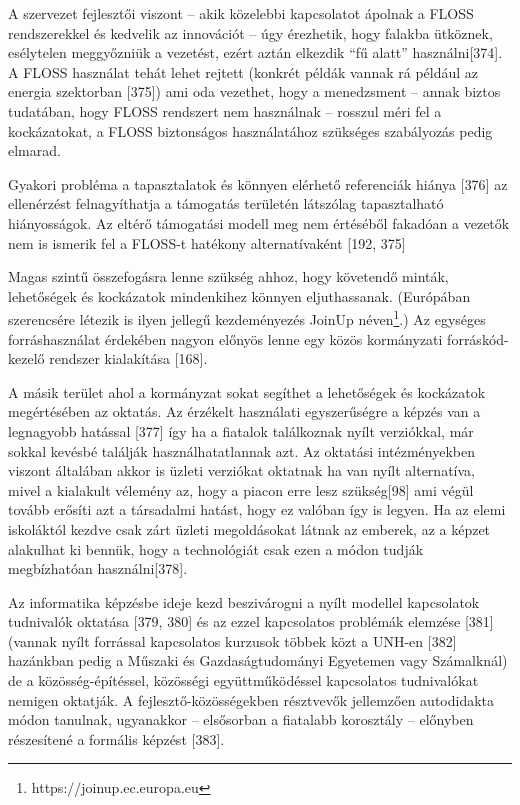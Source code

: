 \documentclass[12pt,magyar,a4paper,oneside]{scrreprt}
\begin{document}
A szervezet fejlesztői viszont -- akik közelebbi kapcsolatot ápolnak a
FLOSS rendszerekkel és kedvelik az innovációt -- úgy érezhetik, hogy
falakba ütköznek, esélytelen meggyőzniük a vezetést, ezért aztán
elkezdik ``fű alatt'' használni{[}374{]}. A FLOSS használat tehát lehet
rejtett (konkrét példák vannak rá például az energia szektorban
{[}375{]}) ami oda vezethet, hogy a menedzsment -- annak biztos
tudatában, hogy FLOSS rendszert nem használnak -- rosszul méri fel a
kockázatokat, a FLOSS biztonságos használatához szükséges szabályozás
pedig elmarad.

Gyakori probléma a tapasztalatok és könnyen elérhető referenciák hiánya
{[}376{]} az ellenérzést felnagyíthatja a támogatás területén látszólag
tapasztalható hiányosságok. Az eltérő támogatási modell meg nem
értéséből fakadóan a vezetők nem is ismerik fel a FLOSS-t hatékony
alternatívaként {[}192, 375{]}

Magas szintű összefogásra lenne szükség ahhoz, hogy követendő minták,
lehetőségek és kockázatok mindenkihez könnyen eljuthassanak. (Európában
szerencsére létezik is ilyen jellegű kezdeményezés JoinUp
néven\footnote{https://joinup.ec.europa.eu}.) Az egységes
forráshasználat érdekében nagyon előnyös lenne egy közös kormányzati
forráskód-kezelő rendszer kialakítása {[}168{]}.

A másik terület ahol a kormányzat sokat segíthet a lehetőségek és
kockázatok megértésében az oktatás. Az érzékelt használati egyszerűségre
a képzés van a legnagyobb hatással {[}377{]} így ha a fiatalok
találkoznak nyílt verziókkal, már sokkal kevésbé találják
használhatatlannak azt. Az oktatási intézményekben viszont általában
akkor is üzleti verziókat oktatnak ha van nyílt alternatíva, mivel a
kialakult vélemény az, hogy a piacon erre lesz szükség{[}98{]} ami végül
tovább erősíti azt a társadalmi hatást, hogy ez valóban így is legyen.
Ha az elemi iskoláktól kezdve csak zárt üzleti megoldásokat látnak az
emberek, az a képzet alakulhat ki bennük, hogy a technológiát csak ezen
a módon tudják megbízhatóan használni{[}378{]}.

Az informatika képzésbe ideje kezd beszivárogni a nyílt modellel
kapcsolatok tudnivalók oktatása {[}379, 380{]} és az ezzel kapcsolatos
problémák elemzése {[}381{]} (vannak nyílt forrással kapcsolatos
kurzusok többek közt a UNH-en {[}382{]} hazánkban pedig a Műszaki és
Gazdaságtudományi Egyetemen vagy Számalknál) de a közösség-építéssel,
közösségi együttműködéssel kapcsolatos tudnivalókat nemigen oktatják. A
fejlesztő-közösségekben résztvevők jellemzően autodidakta módon
tanulnak, ugyanakkor -- elsősorban a fiatalabb korosztály -- előnyben
részesítené a formális képzést {[}383{]}.
\end{document}
